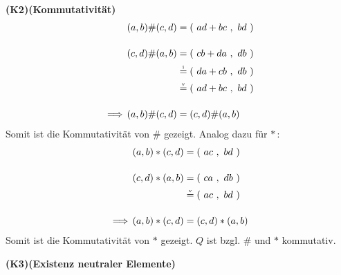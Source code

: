 \documentclass[a4paper,graphics,12pt]{article}
\newcommand{\up}[2]{\mathrel{\overset{\makebox[0pt]{\mbox{\normalfont\tiny #2}}}{#1}}}
\newcommand{\pair}[2]{(\ #1\ ,\ #2\ )}
\begin{document}
\newpage

\textbf{(K2)(Kommutativität)}
    \begin{align*}
        (a,b) \# (c,d) &= \pair{ad+bc}{bd} \\[12pt]
        (c,d) \# (a,b) &= \pair{cb+da}{db} \\[1pt]
        &\up{=}{i} \pair{da+cb}{db} \\[1pt]
        &\up{=}{v} \pair{ad+bc}{bd} \\[12pt]
        \,\Longrightarrow\, (a,b) \# (c,d) &= (c,d) \# (a,b)
    \end{align*}
    Somit ist die Kommutativität von $\#$ gezeigt. Analog dazu für $*$\,:
    \begin{align*}
        (a,b) * (c,d) &= \pair{ac}{bd} \\[12pt]
        (c,d) * (a,b) &= \pair{ca}{db} \\[1pt]
        &\up{=}{v} \pair{ac}{bd} \\[12pt]
        \,\Longrightarrow\, (a,b) * (c,d) &= (c,d) * (a,b)
    \end{align*}
    Somit ist die Kommutativität von $*$ gezeigt. $Q$ ist bzgl. $\#$ und $*$
    kommutativ.

\textbf{(K3)(Existenz neutraler Elemente)}
\end{document}
